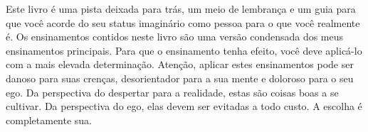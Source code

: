 Este livro é uma pista deixada para trás, um meio de lembrança e um guia para que você acorde do seu status imaginário como pessoa para o que você realmente é. Os ensinamentos contidos neste livro são uma versão condensada dos meus ensinamentos principais. Para que o ensinamento tenha efeito, você deve aplicá-lo com a mais elevada determinação. Atenção, aplicar estes ensinamentos pode ser danoso para suas crenças, desorientador para a sua mente e doloroso para o seu ego. Da perspectiva do despertar para a realidade, estas são coisas boas a se cultivar. Da perspectiva do ego, elas devem ser evitadas a todo custo. A escolha é completamente sua.
